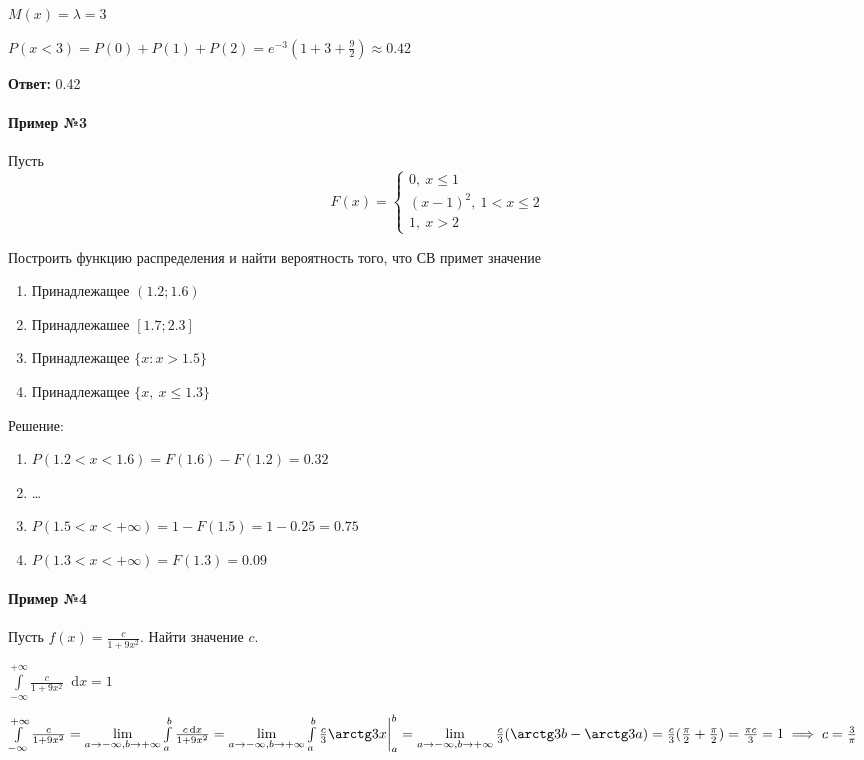 \documentclass{article}
\newcommand*\diff{\mathop{}\!\mathrm{d}}
\begin{document}
$M(x) = \lambda = 3$

$P(x < 3) = P(0) + P(1) + P(2) = e^{-3} (1 + 3 + \frac{9}{2}) \approx 0.42$

\textbf{Ответ:} 0.42

\paragraph{Пример №3}

Пусть $$F(x) = \begin{cases}
    0, \ x \le 1 \\
    (x - 1)^2, \ 1 < x \le 2 \\
    1, \ x > 2
\end{cases}
$$

Построить функцию распределения и найти вероятность того, что СВ примет значение

\begin{multicols}{2}
    \begin{enumerate}
        \item Принадлежащее $(1.2; 1.6)$
        \item Принадлежашее $[1.7; 2.3]$
        \item Принадлежащее $\{ x: x > 1.5 \}$
        \item Принадлежащее $\{ x, \ x \le 1.3 \}$
    \end{enumerate}    
\end{multicols}

Решение:

\begin{enumerate}
    \item $P(1.2 < x < 1.6) = F(1.6) - F(1.2) = 0.32$
    \item \dots
    \item $P(1.5 < x < +\infty) = 1 - F(1.5) = 1 - 0.25 = 0.75$
    \item $P(1.3 < x < +\infty) = F(1.3) = 0.09$
\end{enumerate}

\paragraph{Пример №4}

Пусть $f(x) = \frac{c}{1 + 9x^2}$. Найти значение $c$.

$\int\limits_{-\infty}^{+\infty} \frac{c}{1 + 9x^2} \diff x = 1$

$\int\limits_{-\infty}^{+\infty} \frac{c}{1 + 9x^2} = \lim\limits_{a \to -\infty, b \to +\infty} \int\limits_{a}^{b} \frac{c \diff x}{1 + 9x^2} = \lim\limits_{a \to -\infty, b \to +\infty} \int\limits_{a}^{b} \frac{c}{3} \arctg 3x \bigg|_{a}^{b} = \lim\limits_{a \to -\infty, b \to +\infty} \frac{c}{3} (\arctg 3b - \arctg 3a) = \frac{c}{3} (\frac{\pi}{2} + \frac{\pi}{2}) = \frac{\pi c}{3} = 1 \implies c = \frac{3}{\pi}$
\end{document}
